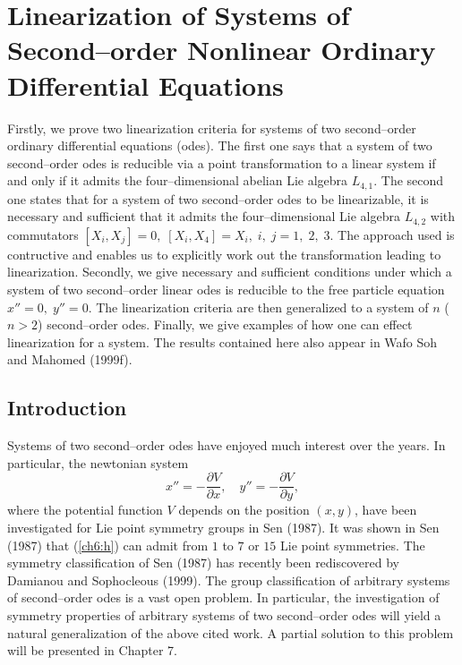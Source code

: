 %

\chapter{ Linearization of Systems of Second--order
Nonlinear Ordinary Differential Equations}

Firstly, we prove two linearization criteria for systems of
two second--order ordinary
differential equations (odes). The first one says that a system of two 
second--order odes is reducible via a point transformation to a linear system
if and only if it admits the four--dimensional abelian Lie algebra 
$L_{4,1}$. The second one states that for a system of
two second--order odes to be linearizable, it is necessary and sufficient that
it admits the four--dimensional  Lie algebra
$L_{4,2}$ with commutators
$[X_i,X_j]=0,\;[X_i,X_4]=X_i,\;i,\;j=1,\;2,\;3.$ The approach used is
contructive and enables us to explicitly work out
the transformation leading to linearization.
Secondly, we give necessary and sufficient conditions under which
a system of two second--order linear odes is reducible to the
free particle equation $x''=0,\;y''=0$. 
The linearization criteria  are then generalized to a system of $n$
($n > 2$) second--order odes. Finally, we give examples of how one can
effect linearization for a system. The results contained here also appear
in Wafo Soh and Mahomed (1999f).
\section{Introduction}
Systems of two second--order odes have enjoyed much interest over the years.
In particular, the newtonian system
\begin{equation}
\label{ch6:h}
x''=-\frac{\partial V}{\partial x},\quad
y''=-\frac{\partial V}{\partial y},
\end{equation}
where the potential function $V$ depends on the position $(x,y)$, have been
investigated for Lie point symmetry groups in Sen (1987). It was shown in
Sen (1987) that (\ref{ch6:h}) can admit from $1$ to $7$ or $15$ Lie point
symmetries. The symmetry classification of Sen (1987) has recently been
rediscovered by Damianou and Sophocleous (1999). The group classification
of arbitrary systems of second--order odes is a vast open problem.
In particular, the investigation of symmetry properties of arbitrary systems
of two second--order odes will yield a natural generalization of the above
cited work. A partial solution to this problem will be presented
in Chapter 7.


